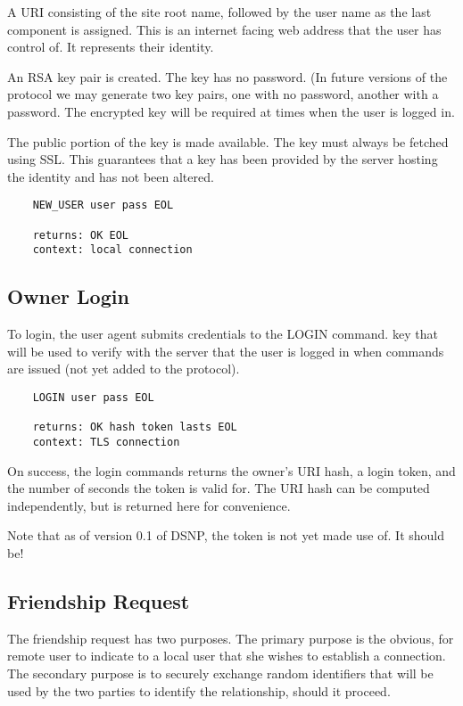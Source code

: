 \documentclass[letterpaper,11pt,oneside]{article}
\begin{document}
A URI consisting of the site root name, followed by the user name as the last
component is assigned. This is an internet facing web address that the user has
control of. It represents their identity.

An RSA key pair is created. The key has no password. (In future versions of the
protocol we may generate two key pairs, one with no password,  another with a
password. The encrypted key will be required at times when the user is logged
in.

The public portion of the key is made available. The key must always be fetched
using SSL. This guarantees that a key has been provided by the server hosting
the identity and has not been altered.

\vspace{10pt}
\begin{verbatim}
    NEW_USER user pass EOL

    returns: OK EOL
    context: local connection
\end{verbatim}

\subsection{Owner Login}

To login, the user agent submits credentials to the LOGIN command. key that
will be used to verify with the server that the user is logged in when commands
are issued (not yet added to the protocol).

\vspace{10pt}
\begin{verbatim}
    LOGIN user pass EOL

    returns: OK hash token lasts EOL
    context: TLS connection
\end{verbatim}
\vspace{10pt}

On success, the login commands returns the owner's URI hash, a login token, and
the number of seconds the token is valid for. The URI hash can be computed
independently, but is returned here for convenience.

Note that as of version 0.1 of DSNP, the token is not yet made use of. It
should be!

\subsection{Friendship Request}

The friendship request has two purposes. The primary purpose is the obvious,
for remote user to indicate to a local user that she wishes to establish a
connection. The secondary purpose is to securely exchange random identifiers
that will be used by the two parties to identify the relationship, should it
proceed.
\end{document}
